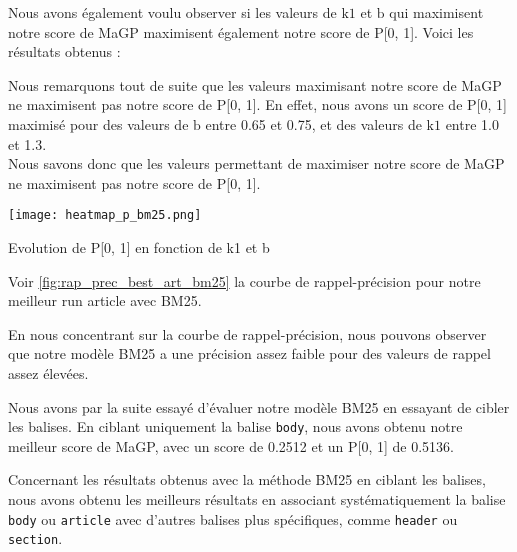 \documentclass[a4paper, 12pt]{article}
\begin{document}
Nous avons également voulu observer si les valeurs de $\text{k1}$ et $\text{b}$ qui maximisent notre score de MaGP
maximisent également notre score de P[0, 1]. 
Voici les résultats obtenus :

\begin{table}[!h]
    \begin{minipage}{0.45\linewidth}
        Nous remarquons tout de suite que les valeurs maximisant notre score de MaGP ne maximisent pas notre score de P[0, 1].
        En effet, nous avons un score de P[0, 1] maximisé pour des valeurs de $\text{b}$ entre 0.65 et 0.75,
        et des valeurs de $\text{k1}$ entre 1.0 et 1.3. \\

        Nous savons donc que les valeurs permettant de maximiser notre score de MaGP ne maximisent pas notre score de P[0, 1].
    \end{minipage}
    \hspace{0.05\linewidth} %
    \begin{minipage}{0.55\linewidth}
        \centering
        \texttt{[image: heatmap\_p\_bm25.png]}
        \label{fig:enter-label}
        \caption{Evolution de P[0, 1] en fonction de k1 et b}
    \end{minipage}%
\end{table}

Voir \ref{fig:rap_prec_best_art_bm25} la courbe de rappel-précision pour notre meilleur run article avec BM25.



En nous concentrant sur la courbe de rappel-précision,
nous pouvons observer que notre modèle BM25 a une précision assez faible pour des valeurs de rappel assez élevées.

Nous avons par la suite essayé d'évaluer notre modèle BM25 en essayant de cibler les balises.
En ciblant uniquement la balise \texttt{body}, nous
avons obtenu notre meilleur score de MaGP, avec un score de 0.2512 et un P[0, 1] de 0.5136.

\newpage

Concernant les résultats obtenus avec la méthode BM25 en ciblant les balises, nous avons obtenu les meilleurs résultats en 
associant systématiquement la balise \texttt{body} ou \texttt{article} avec d'autres balises plus spécifiques, comme \texttt{header} ou \texttt{section}.
\end{document}
